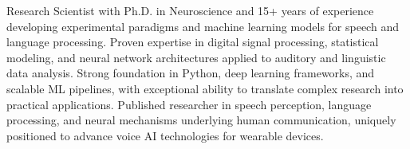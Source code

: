 

\begin{cvparagraph}


 Research Scientist with Ph.D. in Neuroscience and 15+ years of experience developing experimental paradigms and machine learning models for speech and language processing. Proven expertise in digital signal processing, statistical modeling, and neural network architectures applied to auditory and linguistic data analysis. Strong foundation in Python, deep learning frameworks, and scalable ML pipelines, with exceptional ability to translate complex research into practical applications. Published researcher in speech perception, language processing, and neural mechanisms underlying human communication, uniquely positioned to advance voice AI technologies for wearable devices.
\end{cvparagraph}
